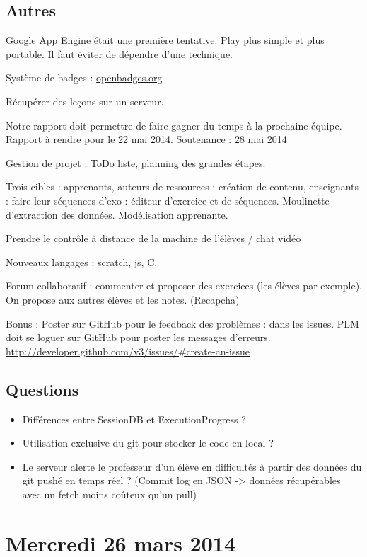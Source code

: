 \documentclass[12pt,a4paper]{article}
\begin{document}
\subsection{Autres}

Google App Engine était une première tentative. Play plus simple et plus portable. Il faut éviter de dépendre d'une technique.

Système de badges : \url{openbadges.org}

Récupérer des leçons sur un serveur.

Notre rapport doit permettre de faire gagner du temps à la prochaine équipe. Rapport à rendre pour le 22 mai 2014. Soutenance : 28 mai 2014

Gestion de projet : ToDo liste, planning des grandes étapes.

Trois cibles : apprenants, auteurs de ressources : création de contenu, enseignants : faire leur séquences d'exo : éditeur d'exercice et de séquences.
Moulinette d'extraction des données. Modélisation apprenante.

Prendre le contrôle à distance de la machine de l'élèves / chat vidéo

Nouveaux langages : scratch, js, C.

Forum collaboratif : commenter et proposer des exercices (les élèves par exemple). On propose aux autres élèves et les notes. (Recapcha) 


Bonus :
Poster sur GitHub pour le feedback des problèmes : dans les issues.
PLM doit se loguer sur GitHub pour poster les messages d'erreurs.
\url{http://developer.github.com/v3/issues/#create-an-issue}

\subsection{Questions}
\begin{itemize}
\item Différences entre SessionDB et ExecutionProgress ?
\item Utilisation exclusive du git pour stocker le code en local ?
\item Le serveur alerte le professeur d'un élève en difficultés à partir des données du git pushé en temps réel ? (Commit log en JSON -> données récupérables avec un fetch moins coûteux qu'un pull)
\end{itemize}

\section{Mercredi 26 mars 2014}
\end{document}
